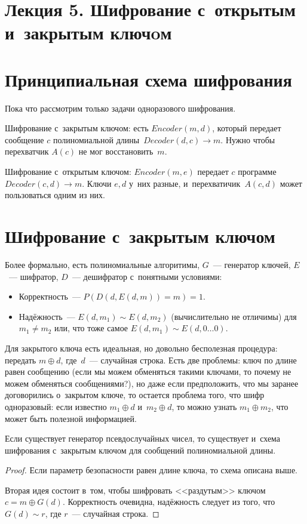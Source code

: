 \documentclass{article}
\begin{document}
\section*{Лекция 5. Шифрование с~открытым и~закрытым ключoм}
\resetcntrs

\section{Принципиальная схема шифрования}

Пока что рассмотрим только задачи одноразового шифрования.

Шифрование с~закрытым ключом: есть $Encoder(m, d)$, который передает сообщение
$c$ полиномиальной длины~$Decoder(d, c) \rightarrow m$. Нужно чтобы перехватчик
$A(c)$ не мог восстановить~$m$.

Шифрование с~открытым ключом: $Encoder(m, e)$ передает $c$ программе $Decoder(c,
d) \rightarrow m$. Ключи $e, d$ у~них разные, и~перехватичик~$A(c, d)$ может
пользоваться одним из них.

\section{Шифрование с~закрытым ключом}

Более формально, есть полиномиальные алгоритимы, $G$~--- генератор ключей,
$E$~--- шифратор, $D$~--- дешифратор с~понятными условиями:
\begin{itemize}
	\item Корректность~--- $P(D(d, E(d,m)) = m) = 1$.
	\item Надёжность~--- $E(d, m_1) \sim E(d, m_2)$ (вычислительно не отличимы)
		для $m_1 \ne m_2$ или, что тоже самое $E(d, m_1) \sim E(d, 0\ldots0)$.
\end{itemize}

Для закрытого ключа есть идеальная, но довольно бесполезная процедура: передать
$m \oplus d$, где~$d$~--- случайная строка. Есть две проблемы: ключ по длине
равен сообщению (если мы можем обменяться такими ключами, то почему не можем
обменяться сообщениями?), но даже если предположить, что мы заранее договорились
о~закрытом ключе, то остается проблема того, что шифр одноразовый: если известно
$m_1 \oplus d$ и~$m_2 \oplus d$, то можно узнать $m_1 \oplus m_2$, что может
быть полезной информацией.

\begin{theorem}
	Если существует генератор псевдослучайных чисел, то существует и~схема
	шифрования с~закрытым ключом для сообщений полиномиальной длины.
\end{theorem}
\begin{proof}
	Если параметр безопасности равен длине ключа, то схема описана выше.

	Вторая идея состоит в~том, чтобы шифровать <<раздутым>> ключом $c = m \oplus
	G(d)$. Корректность очевидна, надёжность следует из того, что $G(d) \sim r$,
	где $r$~--- случайная строка.
\end{proof}
\end{document}
